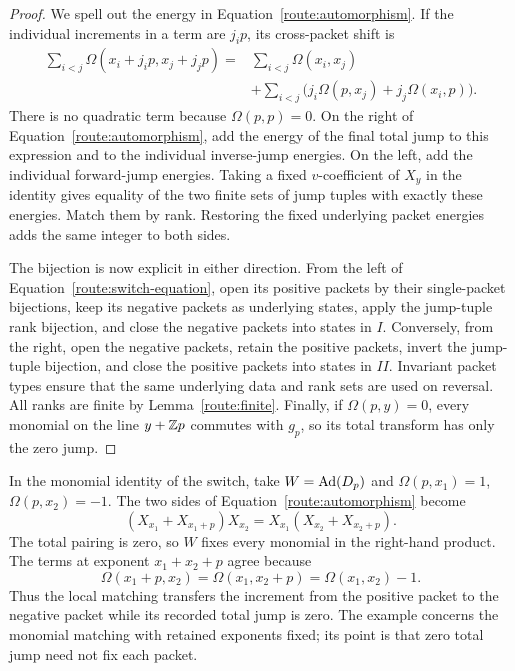 \begin{proof}
We spell out the energy in Equation~\eqref{route:automorphism}.  If the
individual increments in a term are $j_i p$, its cross-packet shift is
\begin{equation}
 \label{route:cross-energy}
 \begin{split}
 \sum_{i<j}\Omega(x_i+j_i p,x_j+j_j p)
 ={}&\sum_{i<j}\Omega(x_i,x_j)\\
 &+\sum_{i<j}\bigl(j_i\Omega(p,x_j)
                         +j_j\Omega(x_i,p)\bigr).
 \end{split}
\end{equation}
There is no quadratic term because $\Omega(p,p)=0$.  On the right
of Equation~\eqref{route:automorphism}, add the energy of the final total
jump to this expression and to the individual inverse-jump energies.
On the left, add the individual forward-jump energies.  Taking a
fixed $v$-coefficient of $X_y$ in the identity gives equality of the
two finite sets of jump tuples with exactly these energies.
Match them by rank.  Restoring the fixed underlying packet energies
adds the same integer to both sides.

The bijection is now explicit in either direction.  From the left of
Equation~\eqref{route:switch-equation}, open its positive packets by their
single-packet bijections, keep its negative packets as underlying
states, apply the jump-tuple rank bijection, and close the negative
packets into states in $I$.  Conversely, from the right, open the
negative packets, retain the positive packets, invert the jump-tuple
bijection, and close the positive packets into states in $II$.
Invariant packet types ensure that the same underlying data and rank
sets are used on reversal.  All ranks are finite by
Lemma~\ref{route:finite}.  Finally, if $\Omega(p,y)=0$, every monomial
on the line $y+\mathbb Z p$ commutes with $g_p$, so its total transform has
only the zero jump.
\end{proof}

\begin{example}
\label{route:zero-example}
In the monomial identity of the switch, take $W=\operatorname{Ad}(D_p)$ and
$\Omega(p,x_1)=1$, $\Omega(p,x_2)=-1$.
The two sides of Equation~\eqref{route:automorphism} become
\[
 (X_{x_1}+X_{x_1+p})X_{x_2}
   =X_{x_1}(X_{x_2}+X_{x_2+p}).
\]
The total pairing is zero, so $W$ fixes every monomial in the
right-hand product. The terms at exponent $x_1+x_2+p$ agree because
\[
 \Omega(x_1+p,x_2)=\Omega(x_1,x_2+p)=\Omega(x_1,x_2)-1.
\]
Thus the local matching transfers the increment from the positive
packet to the negative packet while its recorded total jump is zero.
The example concerns the monomial matching with retained exponents
fixed; its point is that zero total jump need not fix each packet.
\end{example}

